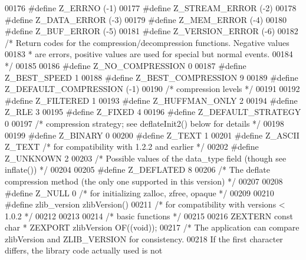 \begin{DoxyCode}
00176 \textcolor{preprocessor}{#define Z\_ERRNO        (-1)}
00177 \textcolor{preprocessor}{#define Z\_STREAM\_ERROR (-2)}
00178 \textcolor{preprocessor}{#define Z\_DATA\_ERROR   (-3)}
00179 \textcolor{preprocessor}{#define Z\_MEM\_ERROR    (-4)}
00180 \textcolor{preprocessor}{#define Z\_BUF\_ERROR    (-5)}
00181 \textcolor{preprocessor}{#define Z\_VERSION\_ERROR (-6)}
00182 \textcolor{comment}{/* Return codes for the compression/decompression functions. Negative values}
00183 \textcolor{comment}{ * are errors, positive values are used for special but normal events.}
00184 \textcolor{comment}{ */}
00185 
00186 \textcolor{preprocessor}{#define Z\_NO\_COMPRESSION         0}
00187 \textcolor{preprocessor}{#define Z\_BEST\_SPEED             1}
00188 \textcolor{preprocessor}{#define Z\_BEST\_COMPRESSION       9}
00189 \textcolor{preprocessor}{#define Z\_DEFAULT\_COMPRESSION  (-1)}
00190 \textcolor{comment}{/* compression levels */}
00191 
00192 \textcolor{preprocessor}{#define Z\_FILTERED            1}
00193 \textcolor{preprocessor}{#define Z\_HUFFMAN\_ONLY        2}
00194 \textcolor{preprocessor}{#define Z\_RLE                 3}
00195 \textcolor{preprocessor}{#define Z\_FIXED               4}
00196 \textcolor{preprocessor}{#define Z\_DEFAULT\_STRATEGY    0}
00197 \textcolor{comment}{/* compression strategy; see deflateInit2() below for details */}
00198 
00199 \textcolor{preprocessor}{#define Z\_BINARY   0}
00200 \textcolor{preprocessor}{#define Z\_TEXT     1}
00201 \textcolor{preprocessor}{#define Z\_ASCII    Z\_TEXT   }\textcolor{comment}{/* for compatibility with 1.2.2 and earlier */}\textcolor{preprocessor}{}
00202 \textcolor{preprocessor}{#define Z\_UNKNOWN  2}
00203 \textcolor{comment}{/* Possible values of the data\_type field (though see inflate()) */}
00204 
00205 \textcolor{preprocessor}{#define Z\_DEFLATED   8}
00206 \textcolor{comment}{/* The deflate compression method (the only one supported in this version) */}
00207 
00208 \textcolor{preprocessor}{#define Z\_NULL  0  }\textcolor{comment}{/* for initializing zalloc, zfree, opaque */}\textcolor{preprocessor}{}
00209 
00210 \textcolor{preprocessor}{#define zlib\_version zlibVersion()}
00211 \textcolor{comment}{/* for compatibility with versions < 1.0.2 */}
00212 
00213 
00214                         \textcolor{comment}{/* basic functions */}
00215 
00216 ZEXTERN \textcolor{keyword}{const} \textcolor{keywordtype}{char} * ZEXPORT zlibVersion OF((\textcolor{keywordtype}{void}));
00217 \textcolor{comment}{/* The application can compare zlibVersion and ZLIB\_VERSION for consistency.}
00218 \textcolor{comment}{   If the first character differs, the library code actually used is not}

\end{DoxyCode}
